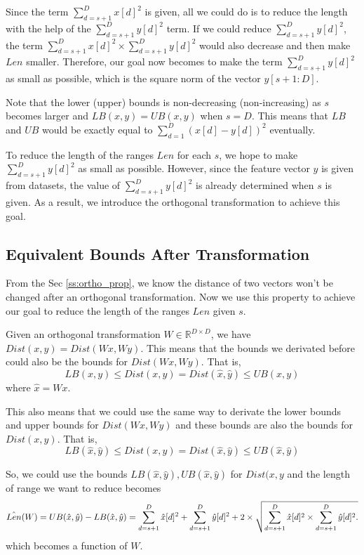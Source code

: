 Since the term $\sum^D_{d=s+1}{x[d]^2}$ is given, all we could do is to reduce the length with the help of the $\sum^D_{d=s+1}{y[d]^2}$ term.  If we could reduce $\sum^D_{d=s+1}{y[d]^2}$, the term $\sum^D_{d=s+1}{x[d]^2}\times \sum^D_{d=s+1}{y[d]^2}$ would also decrease and then make $Len$ smaller.  Therefore, our goal now becomes to make the term $\sum^D_{d=s+1}{y[d]^2}$ as small as possible, which is the square norm of the vector $y[s+1:D]$.

Note that the lower (upper) bounds is non-decreasing (non-increasing) as $s$ becomes larger and $LB(x,y)=UB(x,y)$ when $s=D$.  This means that $LB$ and $UB$ would be exactly equal to $\sum^D_{d=1}{(x[d]-y[d])^2}$ eventually.

To reduce the length of the ranges $Len$ for each $s$, we hope to make $\sum^D_{d=s+1}{y[d]^2}$ as small as possible.  However, since the feature vector $y$ is given from datasets, the value of $\sum^D_{d=s+1}{y[d]^2}$ is already  determined when $s$ is given.  As a result, we introduce the orthogonal transformation to achieve this goal.



\subsection{Equivalent Bounds After Transformation} %
\label{sub:equivalent_bounds_after_transformation}

From the Sec \ref{ss:ortho_prop}, we know the distance of two vectors won't be changed after an orthogonal transformation.  Now we use this property to achieve our goal to reduce the length of the ranges $Len$ given $s$.

Given an orthogonal transformation $W\in\mathbb{R}^{D\times D}$, we have $Dist(x,y)=Dist(Wx,Wy)$.  This means that the bounds we derivated before could also be the bounds for $Dist(Wx,Wy)$.  That is,
\[
LB(x,y)\leq Dist(x,y)=Dist(\hat{x},\hat{y}) \leq UB(x,y)
\]
where $\hat{x}=Wx$.

This also means that we could use the same way to derivate the lower bounds and upper bounds for $Dist(Wx,Wy)$ and these bounds are also the bounds for $Dist(x,y)$.  That is,
\[
LB(\hat{x},\hat{y})\leq Dist(x,y)=Dist(\hat{x},\hat{y}) \leq UB(\hat{x},\hat{y})
\]

So, we could use the bounds $LB(\hat{x},\hat{y}),UB(\hat{x},\hat{y})$ for $Dist(x,y$ and the length of range we want to reduce becomes
\[
\hat{Len}(W) = UB(\hat{x},\hat{y}) - LB(\hat{x},\hat{y}) = \sum^D_{d=s+1}{\hat{x}[d]^2}+\sum^D_{d=s+1}{\hat{y}[d]^2} \notag \\
 +  2 \times \sqrt{\sum^D_{d=s+1}{\hat{x}[d]^2}\times \sum^D_{d=s+1}{\hat{y}[d]^2}.}\label{eq:len-range-hat}
\]
which becomes a function of $W$.

